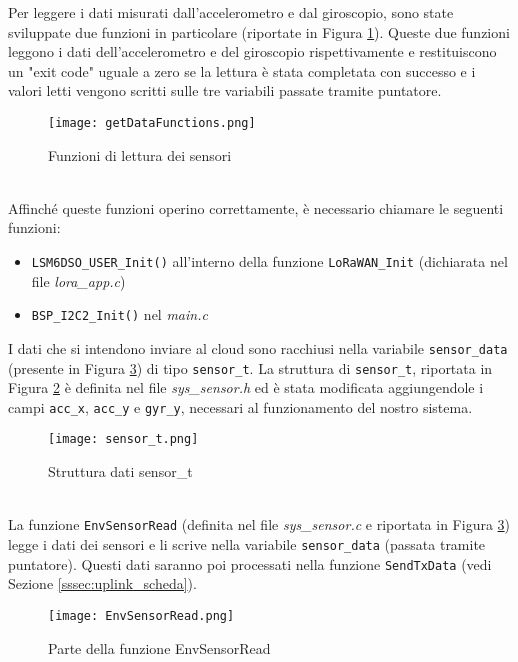 Per leggere i dati misurati dall'accelerometro e dal giroscopio, sono state sviluppate due funzioni in particolare (riportate in Figura \ref{fig:lettura_sensori}). Queste due funzioni leggono i dati dell'accelerometro e del giroscopio rispettivamente e restituiscono un "exit code" uguale a zero se la lettura è stata completata con successo e i valori letti vengono scritti sulle tre variabili passate tramite puntatore.
\begin{figure}[h!]
  \centering
  \texttt{[image: getDataFunctions.png]}
  \caption{Funzioni di lettura dei sensori}
  \label{fig:lettura_sensori}
\end{figure}
\\Affinché queste funzioni operino correttamente, è necessario chiamare le seguenti funzioni:
\begin{itemize}
  \item \Verb|LSM6DSO_USER_Init()| all'interno della funzione \Verb|LoRaWAN_Init| (dichiarata nel file \textit{lora\_app.c})
  \item \Verb|BSP_I2C2_Init()| nel \textit{main.c}
\end{itemize}
I dati che si intendono inviare al cloud sono racchiusi nella variabile \Verb|sensor_data| (presente in Figura \ref{fig:envsensorread}) di tipo \Verb|sensor_t|. La struttura di \Verb|sensor_t|, riportata in Figura \ref{fig:sensor_t} è definita nel file \textit{sys\_sensor.h} ed è stata modificata aggiungendole i campi \Verb|acc_x|, \Verb|acc_y| e \Verb|gyr_y|, necessari al funzionamento del nostro sistema.
\begin{figure}[h!]
  \centering
  \texttt{[image: sensor\_t.png]}
  \caption{Struttura dati sensor\_t}
  \label{fig:sensor_t}
\end{figure}
\\La funzione \Verb|EnvSensorRead| (definita nel file \textit{sys\_sensor.c} e riportata in Figura \ref{fig:envsensorread}) legge i dati dei sensori e li scrive nella variabile \Verb|sensor_data| (passata tramite puntatore). Questi dati saranno poi processati nella funzione \Verb|SendTxData| (vedi Sezione \ref{sssec:uplink_scheda}).
\begin{figure}[h]
  \centering
  \texttt{[image: EnvSensorRead.png]}
  \caption{Parte della funzione EnvSensorRead}
  \label{fig:envsensorread}
\end{figure}

